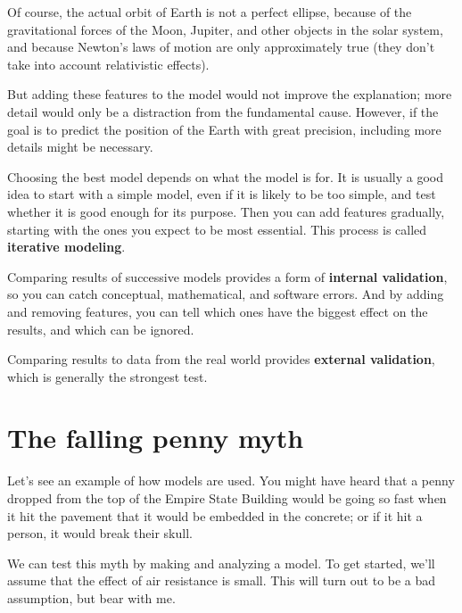 \documentclass[12pt]{book}
\theoremstyle{exercise}
\begin{document}
Of course, the actual orbit of Earth is not a perfect ellipse, because of the gravitational forces of the Moon, Jupiter, and other objects in the solar system, and because Newton's laws of motion are only approximately true (they don't take into account relativistic effects).


But adding these features to the model would not improve the explanation; more detail would only be a distraction from the fundamental cause.  However, if the goal is to predict the position of the Earth with great precision, including more details might be necessary.  

Choosing the best model depends on what the model is for.  It is usually a good idea to start with a simple model, even if it is likely to be too simple, and test whether it is good enough for its purpose.  Then you can add features gradually, starting with the ones you expect to be most essential.  This process is called {\bf iterative modeling}.

Comparing results of successive models provides a form of {\bf internal validation}, so you can catch conceptual, mathematical, and software errors.  And by adding and removing features, you can tell which ones have the biggest effect on the results, and which can be ignored.


Comparing results to data from the real world provides {\bf external validation}, which is generally the strongest test.


\section{The falling penny myth}
\label{penny}

Let's see an example of how models are used.  You might have heard that a penny dropped from the top of the Empire State Building would be going so fast when it hit the pavement that it would be embedded in the concrete; or if it hit a person, it would break their skull.


We can test this myth by making and analyzing a model.  To get started, we'll assume that the effect of air resistance is small.  This will turn out to be a bad assumption, but bear with me.
\end{document}
